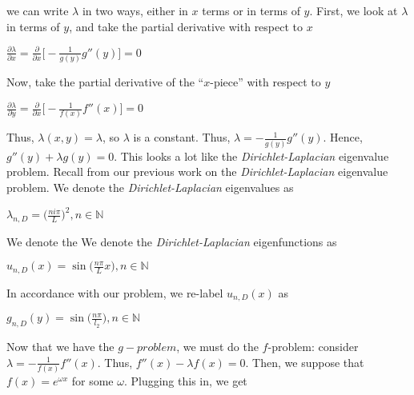 \documentclass[executivepaper]{article}
\begin{document}
\begin{flushleft}
we can write $\lambda$ in two ways, either in $x$ terms or in terms of $y$. First, we look at $\lambda$ in terms of $y$, and take the partial derivative with respect to $x$

\begin{center}

$\frac{\partial \lambda}{\partial x}=\frac{\partial}{\partial x}\bigg[-\frac{1}{g(y)}g''(y)\bigg]=0$

\end{center}

Now, take the partial derivative of the ``$x$-piece'' with respect to $y$

\begin{center}

$\frac{\partial \lambda}{\partial y}=\frac{\partial}{\partial x}\bigg[-\frac{1}{f(x)}f''(x)\bigg]=0$

\end{center}

Thus, $\lambda(x,y)=\lambda$, so $\lambda$ is a constant. Thus, $\lambda=-\frac{1}{g(y)}g''(y)$. Hence, $g''(y)+\lambda g(y)=0$. This looks a lot like the \textit{Dirichlet-Laplacian} eigenvalue problem. Recall from our previous work on the \textit{Dirichlet-Laplacian} eigenvalue problem. We denote the \textit{Dirichlet-Laplacian} eigenvalues as

\begin{center}

$\lambda_{n, D}=\bigg(\frac{ni \pi}{L}\bigg)^2, n \in \mathbb{N}$

\end{center}

We denote the We denote the \textit{Dirichlet-Laplacian} eigenfunctions as

\begin{center}

$u_{n, D}(x)=\sin\bigg(\frac{n \pi}{L} x\bigg), n \in \mathbb{N}$

\end{center}

In accordance with our problem, we re-label $u_{n, D}(x)$ as

\begin{center}

$g_{n, D}(y)=\sin\bigg(\frac{n \pi}{l_{2}}\bigg), n \in \mathbb{N}$

\end{center}

Now that we have the $g-problem$, we must do the $f$-problem: consider $\lambda=-\frac{1}{f(x)} f''(x)$. Thus, $f''(x)-\lambda f(x)=0$. Then, we suppose that $f(x)=e^{\omega x}$ for some $\omega$. Plugging this in, we get


\end{flushleft}
\end{document}
